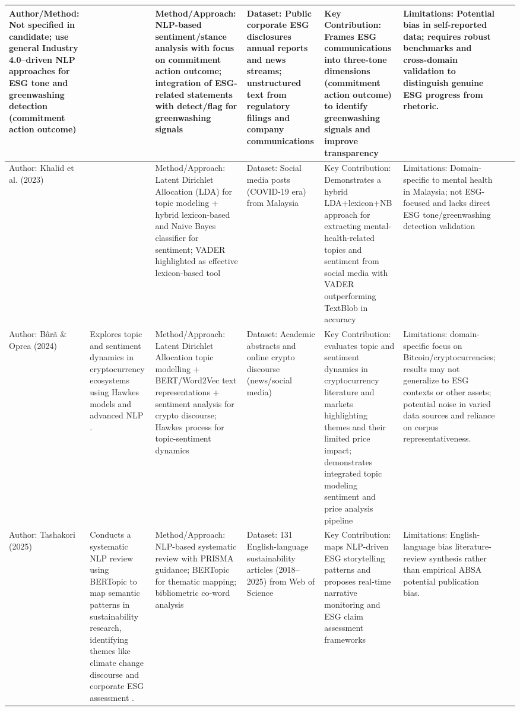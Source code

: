\documentclass{article}
\begin{document}
\begin{landscape}
\begin{longtable}{p{1.8cm}
p{2.6cm}
p{3.4cm}
p{2.6cm}
p{3.5cm}
p{3.5cm}
p{0.8cm}}
Author/Method: Not specified in candidate; use general Industry 4.0–driven NLP approaches for ESG tone and greenwashing detection (commitment action outcome) & ~ & Method/Approach: NLP-based sentiment/stance analysis with focus on commitment action outcome; integration of ESG-related statements with detect/flag for greenwashing signals & Dataset: Public corporate ESG disclosures annual reports and news streams; unstructured text from regulatory filings and company communications & Key Contribution: Frames ESG communications into three-tone dimensions (commitment action outcome) to identify greenwashing signals and improve transparency & Limitations: Potential bias in self-reported data; requires robust benchmarks and cross-domain validation to distinguish genuine ESG progress from rhetoric. & ~ \\ \hline
Author: Khalid et al. (2023) & ~ & Method/Approach: Latent Dirichlet Allocation (LDA) for topic modeling + hybrid lexicon-based and Naive Bayes classifier for sentiment; VADER highlighted as effective lexicon-based tool & Dataset: Social media posts (COVID-19 era) from Malaysia & Key Contribution: Demonstrates a hybrid LDA+lexicon+NB approach for extracting mental-health-related topics and sentiment from social media with VADER outperforming TextBlob in accuracy & Limitations: Domain-specific to mental health in Malaysia; not ESG-focused and lacks direct ESG tone/greenwashing detection validation & ~ \\ \hline
Author: Bârã \& Oprea (2024) & Explores topic and sentiment dynamics in cryptocurrency ecosystems using Hawkes models and advanced NLP  \parencite{marco_ortu_a66901d3}. & Method/Approach: Latent Dirichlet Allocation topic modelling + BERT/Word2Vec text representations + sentiment analysis for crypto discourse; Hawkes process for topic-sentiment dynamics & Dataset: Academic abstracts and online crypto discourse (news/social media) & Key Contribution: evaluates topic and sentiment dynamics in cryptocurrency literature and markets highlighting themes and their limited price impact; demonstrates integrated topic modeling sentiment and price analysis pipeline & Limitations: domain-specific focus on Bitcoin/cryptocurrencies; results may not generalize to ESG contexts or other assets; potential noise in varied data sources and reliance on corpus representativeness. & ~ \\ \hline
Author: Tashakori (2025) & Conducts a systematic NLP review using BERTopic to map semantic patterns in sustainability research, identifying themes like climate change discourse and corporate ESG assessment  \parencite{ehsan_tashakori_d110c79c}. & Method/Approach: NLP-based systematic review with PRISMA guidance; BERTopic for thematic mapping; bibliometric co-word analysis & Dataset: 131 English-language sustainability articles (2018–2025) from Web of Science & Key Contribution: maps NLP-driven ESG storytelling patterns and proposes real-time narrative monitoring and ESG claim assessment frameworks & Limitations: English-language bias literature-review synthesis rather than empirical ABSA potential publication bias. & ~ \\ \hline

\end{longtable}
\end{landscape}
\end{document}
